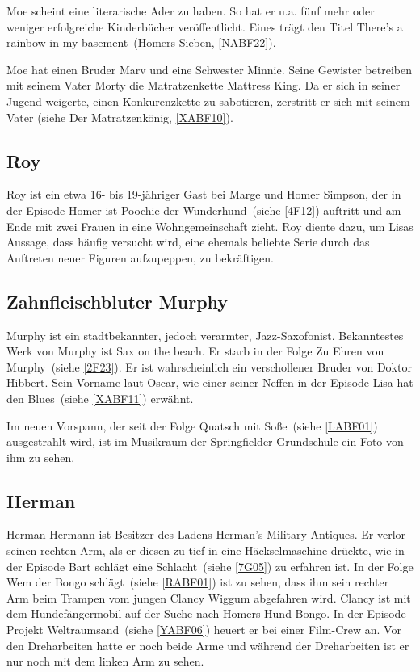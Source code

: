 {Moe scheint eine literarische Ader zu haben. So hat er u.a. fünf mehr oder weniger erfolgreiche Kinderbücher veröffentlicht. Eines trägt den Titel \glqq There's a rainbow in my basement\grqq\ (\glqq Homers Sieben\grqq , \ref{NABF22}).

Moe hat einen Bruder Marv und eine Schwester Minnie. Seine Gewister betreiben mit seinem Vater Morty die Matratzenkette \glqq Mattress King\grqq. Da er sich in seiner Jugend weigerte, einen Konkurenzkette zu sabotieren, zerstritt er sich mit seinem Vater (siehe \glqq Der Matratzenkönig\grqq, \ref{XABF10}).

\subsection{Roy}
Roy ist ein etwa 16- bis 19-jähriger Gast bei Marge und Homer Simpson, der in der Episode \glqq Homer ist \glq Poochie der Wunderhund\grq \grqq\ (siehe \ref{4F12}) auftritt und am Ende mit zwei Frauen in eine Wohngemeinschaft zieht. Roy diente dazu, um Lisas Aussage, dass häufig versucht wird, eine ehemals beliebte Serie durch das Auftreten neuer Figuren aufzupeppen, zu bekräftigen.

\subsection{Zahnfleischbluter Murphy}\label{ZahnfleischbluterMurphy}
Murphy ist ein stadtbekannter, jedoch verarmter, Jazz-Saxofonist. Bekanntestes Werk von Murphy ist \glqq Sax on the beach\grqq . Er starb in der Folge \glqq Zu Ehren von Murphy\grqq\ (siehe \ref{2F23}). Er ist wahrscheinlich ein verschollener Bruder von Doktor Hibbert. Sein Vorname laut Oscar, wie einer seiner Neffen in der Episode \glqq Lisa hat den Blues\grqq\ (siehe \ref{XABF11}) erwähnt.

Im neuen Vorspann, der seit der Folge \glqq Quatsch mit Soße\grqq\ (siehe \ref{LABF01}) ausgestrahlt wird, ist im Musikraum der Springfielder Grundschule ein Foto von ihm zu sehen.


\subsection{Herman}\label{HermanHermann}
Herman Hermann ist Besitzer des Ladens \glqq Herman's Military Antiques\grqq . Er verlor seinen rechten Arm, als er diesen zu tief in eine Häckselmaschine drückte, wie in der Episode \glqq Bart schlägt eine Schlacht\grqq\ (siehe \ref{7G05}) zu erfahren ist. In der Folge \glqq Wem der Bongo schlägt\grqq\ (siehe \ref{RABF01}) ist zu sehen, dass ihm sein rechter Arm beim Trampen vom jungen Clancy Wiggum abgefahren wird. Clancy ist mit dem Hundefängermobil auf der Suche nach Homers Hund Bongo. In der Episode \glqq Projekt Weltraumsand\grqq\ (siehe \ref{YABF06}) heuert er bei einer Film-Crew an. Vor den Dreharbeiten hatte er noch beide Arme und während der Dreharbeiten ist er nur noch mit dem linken Arm zu sehen.

}
